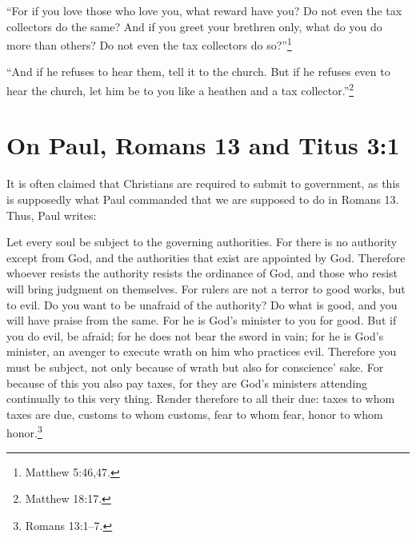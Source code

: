 \documentclass[letterpaper,12pt]{article}
\newenvironment{squote}
  {\small\quote}
  {\endquote\normalsize}
\begin{document}
\begin{squote}
``For if you love those who love you, what reward have you? Do not even the tax collectors do the same? And if you greet your brethren only, what do you do more than others? Do not even the tax collectors do so?''\footnote{Matthew 5:46,47.}
\end{squote}

\begin{squote}
``And if he refuses to hear them, tell it to the church. But if he refuses even to hear the church, let him be to you like a heathen and a tax collector.''\footnote{Matthew 18:17.}
\end{squote}

\section{On Paul, Romans 13 and Titus 3:1}
\label{sec:OnPaulRomans13AndTitus31}

It is often claimed that Christians are required to submit to government, as this is supposedly what Paul commanded that we are supposed to do in Romans 13. Thus, Paul writes:

\begin{squote}
Let every soul be subject to the governing authorities. For there is no authority except from God, and the authorities that exist are appointed by God. Therefore whoever resists the authority resists the ordinance of God, and those who resist will bring judgment on themselves. For rulers are not a terror to good works, but to evil. Do you want to be unafraid of the authority? Do what is good, and you will have praise from the same. For he is God's minister to you for good. But if you do evil, be afraid; for he does not bear the sword in vain; for he is God's minister, an avenger to execute wrath on him who practices evil. Therefore you must be subject, not only because of wrath but also for conscience' sake. For because of this you also pay taxes, for they are God's ministers attending continually to this very thing. Render therefore to all their due: taxes to whom taxes are due, customs to whom customs, fear to whom fear, honor to whom honor.\footnote{Romans 13:1--7.}
\end{squote}
\end{document}
